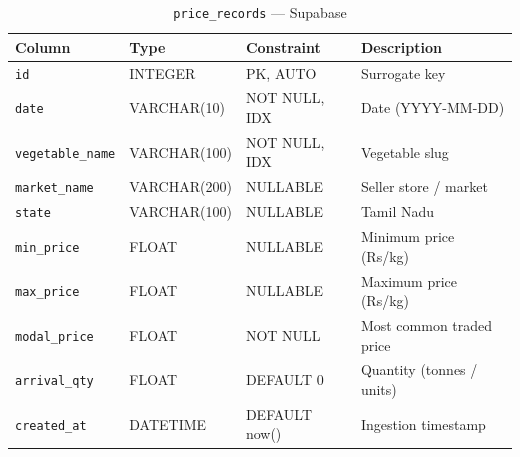 \documentclass[12pt, a4paper, oneside]{report}
\begin{document}
\begin{table}[H]
\centering
\caption{\texttt{price\_records} — Supabase}
\label{tab:price-records}
\begin{tabularx}{\textwidth}{@{} L{3.0cm} L{2.2cm} L{2.5cm} X @{}}
\toprule
\textbf{Column} & \textbf{Type} & \textbf{Constraint} & \textbf{Description} \\
\midrule
\texttt{id}              & INTEGER     & PK, AUTO      & Surrogate key \\
\texttt{date}            & VARCHAR(10) & NOT NULL, IDX & Date (YYYY-MM-DD) \\
\texttt{vegetable\_name} & VARCHAR(100)& NOT NULL, IDX & Vegetable slug \\
\texttt{market\_name}    & VARCHAR(200)& NULLABLE      & Seller store / market \\
\texttt{state}           & VARCHAR(100)& NULLABLE      & Tamil Nadu \\
\texttt{min\_price}      & FLOAT       & NULLABLE      & Minimum price (Rs/kg) \\
\texttt{max\_price}      & FLOAT       & NULLABLE      & Maximum price (Rs/kg) \\
\texttt{modal\_price}    & FLOAT       & NOT NULL      & Most common traded price \\
\texttt{arrival\_qty}    & FLOAT       & DEFAULT 0     & Quantity (tonnes / units) \\
\texttt{created\_at}     & DATETIME    & DEFAULT now() & Ingestion timestamp \\
\bottomrule
\end{tabularx}
\end{table}
\end{document}

